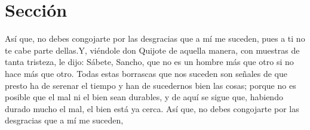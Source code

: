 
\section{Sección}  
Así que, no debes congojarte por las desgracias que a mí me suceden, pues a ti no te cabe parte dellas.Y, viéndole don Quijote de aquella manera, con muestras de tanta tristeza, le dijo: Sábete, Sancho, que no es un hombre más que otro si no hace más que otro. Todas estas borrascas que nos suceden son señales de que presto ha de serenar el tiempo y han de sucedernos bien las cosas; porque no es posible que el mal ni el bien sean durables, y de aquí se sigue que, habiendo durado mucho el mal, el bien está ya cerca. Así que, no debes congojarte por las desgracias que a mí me suceden,	

